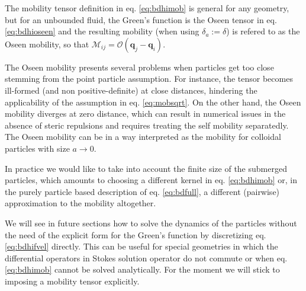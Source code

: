 \documentclass[ twoside,openright,titlepage,numbers=noenddot,%
headinclude,footinclude,cleardoublepage=empty,abstract=on,
BCOR=5mm,paper=a4,fontsize=11pt, dvipsnames
]{scrreprt}
\renewcommand{\vec}[1]{\bm{#1}}
\newcommand{\tens}[1]{\bm{\mathcal{#1}}}
\newcommand{\ppos}{q}
\begin{document}
The mobility tensor definition in eq. \eqref{eq:bdhimob} is general for any geometry, but for an unbounded fluid, the Green's function is the Oseen tensor in eq. \eqref{eq:bdhioseen} and the resulting mobility (when using $\delta_a:=\delta$) is refered to as the Oseen mobility, so that $\tens{M}_{ij} = \tens{O}(\vec{\ppos}_j - \vec{\ppos}_i)$.

The Oseen mobility presents several problems when particles get too close stemming from the point particle assumption. For instance, the tensor becomes ill-formed (and non positive-definite) at close distances, hindering the applicability of the assumption in eq. \eqref{eq:mobsqrt}. On the other hand, the Oseen mobility diverges at zero distance, which can result in numerical issues in the absence of steric repulsions and requires treating the self mobility separatedly. The Oseen mobility can be in a way interpreted as the mobility for colloidal particles with size $a\rightarrow 0$.

In practice we would like to take into account the finite size of the submerged particles, which amounts to choosing a different kernel in eq. \eqref{eq:bdhimob} or, in the purely particle based description of eq. \eqref{eq:bdfull}, a different (pairwise) approximation to the mobility altogether.

We will see in future sections how to solve the dynamics of the particles without the need of the explicit form for the Green's function by discretizing eq. \eqref{eq:bdhifvel} directly. This can be useful for special geometries in which the differential operators in Stokes solution operator do not commute or when eq. \eqref{eq:bdhimob} cannot be solved analytically. For the moment we will stick to imposing a mobility tensor explicitly.
\end{document}
